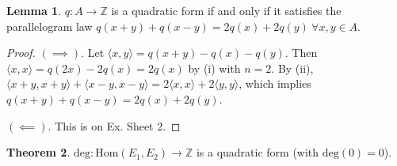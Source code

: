 \documentclass{article}
\theoremstyle{definition}
\newtheorem{theorem}{Theorem}[section]
\newtheorem{lemma}[theorem]{Lemma}
\begin{document}
\begin{lemma}
    $q : A \to \mathbb{Z}$ is a quadratic form if and only if it satisfies the parallelogram law $q(x+y)+q(x-y) = 2q(x)+2q(y) ~\forall x,y \in A$.
\end{lemma}
\begin{proof}
    $(\implies)$. Let $\langle x,y \rangle = q(x+y)-q(x)-q(y)$. Then $\langle x,x \rangle = q(2x) - 2q(x) = 2q(x)$ by (i) with $n=2$. By (ii), $\langle x+y, x+y \rangle + \langle x-y, x-y \rangle = 2 \langle x,x \rangle + 2 \langle y, y \rangle$, which implies $q(x+y)+q(x-y)=2q(x)+2q(y)$.
    \vspace{1mm}
     
    $(\impliedby)$. This is on Ex. Sheet 2.
\end{proof}
\begin{theorem}\label{theorem5.7}
    $\text{deg}:\text{Hom}(E_1,E_2) \to \mathbb{Z}$ is a quadratic form (with $\text{deg}(0)=0$).
\end{theorem}
\end{document}

